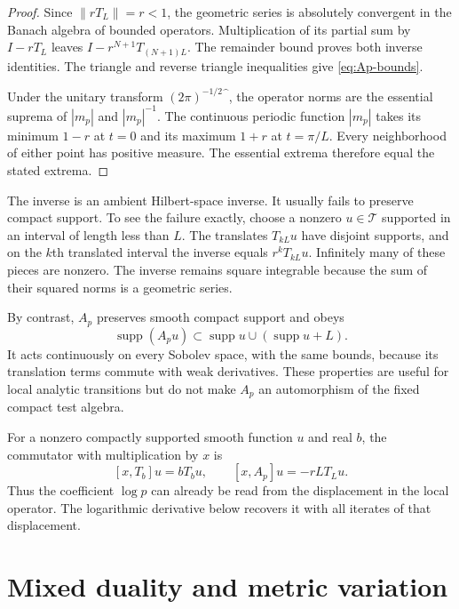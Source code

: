 \documentclass[11pt,letterpaper]{article}
\theoremstyle{definition}
\theoremstyle{remark}
\newcommand{\T}{\mathcal T}
\newcommand{\supp}{\operatorname{supp}}
\begin{document}
\begin{proof}
Since $\|rT_L\|=r<1$, the geometric series is absolutely convergent
in the Banach algebra of bounded operators. Multiplication of its
partial sum by $I-rT_L$ leaves $I-r^{N+1}T_{(N+1)L}$. The remainder
bound proves both inverse identities. The triangle and reverse
triangle inequalities give \eqref{eq:Ap-bounds}.

Under the unitary transform $(2\pi)^{-1/2}\widehat{\phantom f}$,
the operator norms are the essential suprema of $|m_p|$ and
$|m_p|^{-1}$. The continuous periodic function $|m_p|$ takes its
minimum $1-r$ at $t=0$ and its maximum $1+r$ at $t=\pi/L$.
Every neighborhood of either point has positive measure. The essential
extrema therefore equal the stated extrema.
\end{proof}

The inverse is an ambient Hilbert-space inverse. It usually fails to
preserve compact support. To see the failure exactly, choose a nonzero
$u\in\T$ supported in an interval of length less than $L$. The
translates $T_{kL}u$ have disjoint supports, and on the $k$th translated
interval the inverse equals $r^kT_{kL}u$. Infinitely many of these
pieces are nonzero. The inverse remains square integrable because the
sum of their squared norms is a geometric series.

By contrast, $A_p$ preserves smooth compact support and obeys
\begin{equation}\label{eq:support-Ap}
 \supp(A_pu)\subset\supp u\cup(\supp u+L).
\end{equation}
It acts continuously on every Sobolev space, with the same bounds,
because its translation terms commute with weak derivatives.
These properties are useful for local analytic transitions but do
not make $A_p$ an automorphism of the fixed compact test algebra.

For a nonzero compactly supported smooth function $u$ and real $b$,
the commutator with multiplication by $x$ is
\begin{equation}\label{eq:position-commutator}
 [x,T_b]u=bT_bu,\qquad [x,A_p]u=-rLT_Lu.
\end{equation}
Thus the coefficient $\log p$ can already be read from the displacement
in the local operator. The logarithmic derivative below recovers it
with all iterates of that displacement.

\section{Mixed duality and metric variation}
\end{document}
